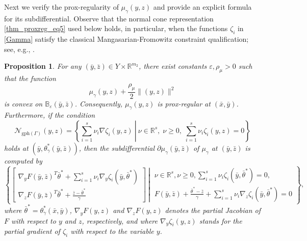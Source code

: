 \documentclass[11pt,a4paper]{article}
\newtheorem{proposition}[theorem]{Proposition}
\theoremstyle{plain}
\begin{document}
Next we verify the prox-regularity of $\mu_\gamma(y,z)$ and provide an explicit formula for its subdifferential.
Observe that the normal cone representation \eqref{thm_proxreg_eq5} used below holds, in particular, when the functions $\zeta_i$ in \eqref{Gamma} satisfy the classical Mangasarian-Fromowitz constraint qualification; see, e.g., \cite[Theorem~6.14]{rockafellar1998variational}.

\begin{proposition}\label{prop:prox-regularity} 
For any $(\bar{y}, \bar{z}) \in Y \times \mathbb{R}^{m_2}$, there exist constants $\varepsilon, \rho_{\mu} > 0$ such that the function $$\mu_\gamma(y, z) + \frac{\rho_{\mu}}{2}\|(y, z)\|^2$$ is convex on $\mathbb{B}_{\varepsilon}(\bar{y}, \bar{z})$. Consequently, $\mu_\gamma(y, z)$ is prox-regular at \( (\bar{x}, \bar{y}) \). Furthermore, if the  condition
\begin{equation}\label{thm_proxreg_eq5}
\mathcal{N}_{\mathrm{gph}(\Gamma)}(y,z) = \left\{ \left.\sum_{i = 1}^{s} \nu_i \nabla \zeta_i({y}, z)  ~\right|~ \nu \in \mathbb{R}^s,\;\nu \ge 0,\;\sum_{i = 1}^{s}\nu_i \zeta_i({y},z ) = 0   \right\}
\end{equation}  
holds at $(\bar{y}, \theta_\gamma^*(\bar y, \bar{z}))$, then the subdifferential $\partial\mu_\gamma(\bar{y}, \bar{z})$ of $ \mu_\gamma$ at $(\bar{y}, \bar{z})$ is computed by
\[
\left\{ \left. \begin{bmatrix}
\nabla_y F(\bar{y}, \bar{z})^T \bar\theta^* + \displaystyle	\sum_{i = 1}^{s} \nu_i \nabla_y \zeta_i(\bar{y}, \bar\theta^*) \\
\nabla_z F(\bar{y}, \bar{z})^T \bar\theta^* + 
\displaystyle \frac{\bar{z} - \bar\theta^*}{\gamma}
\end{bmatrix}	~\right|~ 
\begin{array}{c}
\nu \in \mathbb{R}^s, \nu \ge 0, \displaystyle\sum_{i = 1}^{s}\nu_i \zeta_i(\bar{y}, \bar\theta^* ) = 0, \\
F(\bar y,\bar z)+\displaystyle\frac{\bar\theta^*-\bar z}{\gamma}+\displaystyle\sum_{i=1}^s\nu_i\nabla_z\zeta_i(\bar y,\bar\theta^*)=0
\end{array}
\right\},
\]
where $\bar\theta^*=\theta_\gamma^*(\bar x,\bar y)$, $\nabla_y F(y,z)$ and $\nabla_z F(y,z)$ denotes the partial Jacobian of $F$ with respect to $y$ and $z$, respectively, and where $\nabla_y \zeta_i(y,z)$ stands for the partial gradient of $\zeta_i$ with respect to the variable $y$.
\end{proposition}
\end{document}

